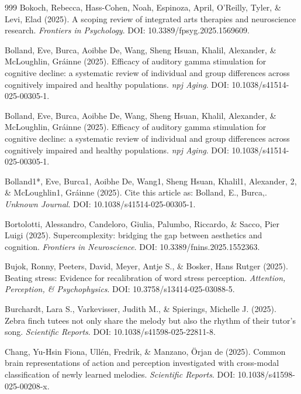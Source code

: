 \documentclass[9pt,onecolumn]{article}
\begin{document}
\begin{thebibliography}{999}
Bokoch, Rebecca, Hass-Cohen, Noah, Espinoza, April, O'Reilly, Tyler, \& Levi, Elad (2025). A scoping review of integrated arts therapies and neuroscience research. \textit{Frontiers in Psychology}. DOI: 10.3389/fpsyg.2025.1569609.

Bolland, Eve, Burca, Aoibhe De, Wang, Sheng Hsuan, Khalil, Alexander, \& McLoughlin, Gráinne (2025). Efficacy of auditory gamma stimulation for cognitive decline: a systematic review of individual and group differences across cognitively impaired and healthy populations. \textit{npj Aging}. DOI: 10.1038/s41514-025-00305-1.

Bolland, Eve, Burca, Aoibhe De, Wang, Sheng Hsuan, Khalil, Alexander, \& McLoughlin, Gráinne (2025). Efficacy of auditory gamma stimulation for cognitive decline: a systematic review of individual and group differences across cognitively impaired and healthy populations. \textit{npj Aging}. DOI: 10.1038/s41514-025-00305-1.

Bolland1*, Eve, Burca1, Aoibhe De, Wang1, Sheng Hsuan, Khalil1, Alexander, 2, \& McLoughlin1, Gráinne (2025). Cite this article as: Bolland, E., Burca,. \textit{Unknown Journal}. DOI: 10.1038/s41514-025-00305-1.

Bortolotti, Alessandro, Candeloro, Giulia, Palumbo, Riccardo, \& Sacco, Pier Luigi (2025). Supercomplexity: bridging the gap between aesthetics and cognition. \textit{Frontiers in Neuroscience}. DOI: 10.3389/fnins.2025.1552363.

Bujok, Ronny, Peeters, David, Meyer, Antje S., \& Bosker, Hans Rutger (2025). Beating stress: Evidence for recalibration of word stress perception. \textit{Attention, Perception, \& Psychophysics}. DOI: 10.3758/s13414-025-03088-5.

Burchardt, Lara S., Varkevisser, Judith M., \& Spierings, Michelle J. (2025). Zebra finch tutees not only share the melody but also the rhythm of their tutor's song. \textit{Scientific Reports}. DOI: 10.1038/s41598-025-22811-8.

Chang, Yu-Hsin Fiona, Ullén, Fredrik, \& Manzano, Örjan de (2025). Common brain representations of action and perception investigated with cross-modal classification of newly learned melodies. \textit{Scientific Reports}. DOI: 10.1038/s41598-025-00208-x.


\end{thebibliography}
\end{document}
